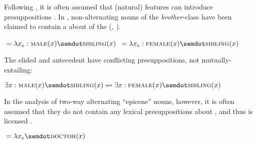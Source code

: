 \documentclass[output=paper,modfonts,newtxmath,hidelinks]{langscibook}
\begin{document}
\noindent Following \citet{cooper83}, it is often assumed that (natural)  features can introduce presuppositions \citep[also see][]{sauerland03,sauerland08,heim08,kratzer09,spathas10,sudo-diss}.
		In , non-alternating nouns of the \textit{brother}-class have been claimed to contain a  about  of the   (\citealt[19]{merchant14}, \citealt[715]{sudospathas-sub20}).
		
		\ea \label{14:ex21}
		\ea {}${}=\lambda x_e : \textsc{male}(x)\semdot \textsc{sibling}(x)$
		\ex {}${}=\lambda x_e : \textsc{female}(x)\semdot \textsc{sibling}(x)$	         
        \z \z
        

\ea 
        \z \z
		
\noindent The elided and antecedent  have conflicting  presuppositions, not mutually-entailing:	
		
		\ea $\exists x: \textsc{male}(x)\semdot \textsc{sibling}(x)\nleftrightarrow \exists x: \textsc{female}(x)\semdot \textsc{sibling}(x)$
        \z
		
\noindent		In the analysis of two-way alternating  ``epicene'' nouns, however, it is often assumed that they do not contain any lexical presuppositions 
		about  , and thus  is licensed .
		
		\ea {}${}=\lambda x_e\semdot \textsc{doctor}(x)$	\label{14:ex24}
        \z
        
\end{document}
